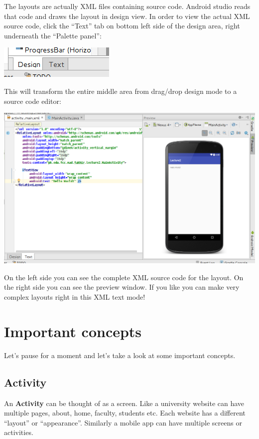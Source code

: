 The layouts are actually XML files containing source code. Android studio reads that code and draws the layout in design view. In order to view the actual XML source code, click the ``Text'' tab on bottom left side of the design area, right underneath the ``Palette panel'':

\begin{center}
	\includegraphics[scale=0.6]{chapters/ch02/images/10_textMode}
\end{center}

This will transform the entire middle area from drag/drop design mode to a source code editor:

\begin{center}
	\includegraphics[scale=0.3]{chapters/ch02/images/11_textMode}
\end{center}

On the left side you can see the complete XML source code for the layout. On the right side you can see the preview window. If you like you can make very complex layouts right in this XML text mode!

\section{Important concepts}
Let's pause for a moment and let's take a look at some important concepts.

\subsection{Activity}
\label{TOAS:activity}
An \textbf{Activity} can be thought of as a screen. Like a university website can have multiple pages, about, home, faculty, students etc. Each website has a different ``layout'' or ``appearance''. Similarly a mobile app can have multiple screens or activities.

